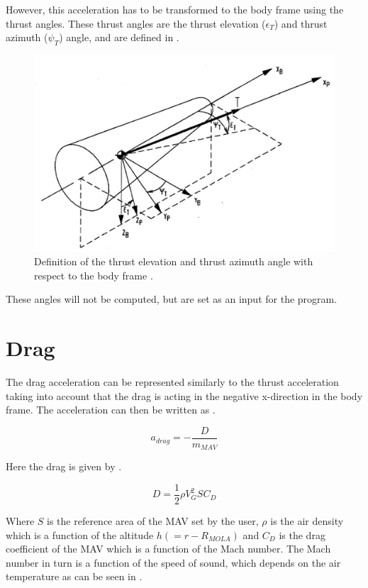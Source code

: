 However, this acceleration has to be transformed to the body frame using the thrust angles. These thrust angles are the thrust elevation ($\epsilon_{T}$) and thrust azimuth ($\psi_{T}$) angle, and are defined in .

\begin{figure}[!ht]
\centering
\includegraphics[width=0.8 \textwidth]{figures/reference_frames/propframe_mooij1994motion.jpg}
\caption{Definition of the thrust elevation and thrust azimuth angle with respect to the body frame \citep{mooij1994motion}.}
\label{fig:propframe_mooij1994motion}
\end{figure}

These angles will not be computed, but are set as an input for the program.


\section{Drag}
\label{sec:dragModel}
The drag acceleration can be represented similarly to the thrust acceleration taking into account that the drag is acting in the negative x-direction in the body frame. The acceleration can then be written as .

\begin{equation} \label{eq:dragModel}
a_{drag}=-\dfrac{D}{m_{MAV}}
\end{equation}

Here the drag is given by .

\begin{equation} \label{eq:dragDragModel}
D=\dfrac{1}{2}\rho V_{G}^{2}SC_{D}
\end{equation}

Where $S$ is the reference area of the \ac{MAV} set by the user, $\rho$ is the air density which is a function of the altitude $h\left(=r-R_{MOLA}\right)$ and $C_{D}$ is the drag coefficient of the \ac{MAV} which is a function of the Mach number. The Mach number in turn is a function of the speed of sound, which depends on the air temperature as can be seen in .

